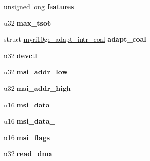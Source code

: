 \begin{DoxyCompactItemize}
\item 
\hypertarget{structmyri10ge__priv_a6742aa1491520668029f8c7a5d00ec11}{
unsigned long {\bfseries features}}
\label{structmyri10ge__priv_a6742aa1491520668029f8c7a5d00ec11}

\item 
\hypertarget{structmyri10ge__priv_aedd1ad481fdacd7ad2bfeb85be276057}{
u32 {\bfseries max\_\-tso6}}
\label{structmyri10ge__priv_aedd1ad481fdacd7ad2bfeb85be276057}

\item 
\hypertarget{structmyri10ge__priv_ab5e1983914abbd01749c9e05eeaab68b}{
struct \hyperlink{structmyri10ge__adapt__intr__coal}{myri10ge\_\-adapt\_\-intr\_\-coal} {\bfseries adapt\_\-coal}}
\label{structmyri10ge__priv_ab5e1983914abbd01749c9e05eeaab68b}

\item 
\hypertarget{structmyri10ge__priv_ab1b096a974bed6c4494f35362fd045ce}{
u32 {\bfseries devctl}}
\label{structmyri10ge__priv_ab1b096a974bed6c4494f35362fd045ce}

\item 
\hypertarget{structmyri10ge__priv_a0b823b15daff5a7364436254424641e6}{
u32 {\bfseries msi\_\-addr\_\-low}}
\label{structmyri10ge__priv_a0b823b15daff5a7364436254424641e6}

\item 
\hypertarget{structmyri10ge__priv_a9a6d95e8937f14d49289eccc8e8253e2}{
u32 {\bfseries msi\_\-addr\_\-high}}
\label{structmyri10ge__priv_a9a6d95e8937f14d49289eccc8e8253e2}

\item 
\hypertarget{structmyri10ge__priv_a6bf70e794a133ae3d263895dbfa8dac1}{
u16 {\bfseries msi\_\-data\_}}
\label{structmyri10ge__priv_a6bf70e794a133ae3d263895dbfa8dac1}

\item 
\hypertarget{structmyri10ge__priv_afd545f3c44a5c37ad7aac47d76cf7989}{
u16 {\bfseries msi\_\-data\_}}
\label{structmyri10ge__priv_afd545f3c44a5c37ad7aac47d76cf7989}

\item 
\hypertarget{structmyri10ge__priv_ad1c4abea22ce949e58a30b00bba9e87f}{
u16 {\bfseries msi\_\-flags}}
\label{structmyri10ge__priv_ad1c4abea22ce949e58a30b00bba9e87f}

\item 
\hypertarget{structmyri10ge__priv_aead8f72c3fe681f388996ff43812e458}{
u32 {\bfseries read\_\-dma}}
\label{structmyri10ge__priv_aead8f72c3fe681f388996ff43812e458}


\end{DoxyCompactItemize}
